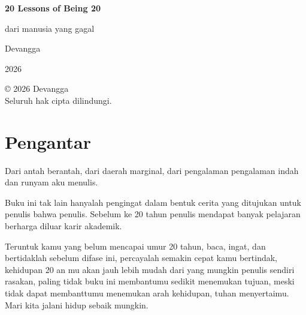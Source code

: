 \documentclass[12pt,oneside]{book}
\begin{document}
	
	
	\begin{titlepage}
		\centering
		\vspace*{4cm}
		
		{\Huge\bfseries 20 Lessons of Being 20\par}
		\vspace{1cm}
		
		{\Large dari manusia yang gagal\par}
		\vspace{3cm}
		
		{\Large Devangga\par}
		\vspace{0.5cm}
		{\large 2026\par}
		
		\vfill
	\end{titlepage}
	
	\cleardoublepage
	
	\setcounter{page}{1}
	
	\thispagestyle{empty}
	\vspace*{8cm}
	\begin{center}
		© 2026 Devangga\\
		Seluruh hak cipta dilindungi.
	\end{center}
	
	\cleardoublepage
	
	\tableofcontents
	\cleardoublepage
	
	\chapter*{Pengantar}
	
	Dari antah berantah, dari daerah marginal, dari pengalaman pengalaman indah dan runyam aku menulis.
	
	Buku ini tak lain hanyalah pengingat dalam bentuk cerita yang ditujukan untuk penulis bahwa penulis. Sebelum ke 20 tahun penulis mendapat banyak pelajaran berharga diluar karir akademik.
	
	Teruntuk kamu yang belum mencapai umur 20 tahun, baca, ingat, dan bertidaklah sebelum difase ini, percayalah semakin cepat kamu bertindak, kehidupan 20 an mu akan jauh lebih mudah dari yang mungkin penulis sendiri rasakan, paling tidak buku ini membantumu sedikit menemukan tujuan, meski tidak dapat membanttumu menemukan arah kehidupan, tuhan menyertaimu. Mari kita jalani hidup sebaik mungkin.	\cleardoublepage
	
\end{document}
